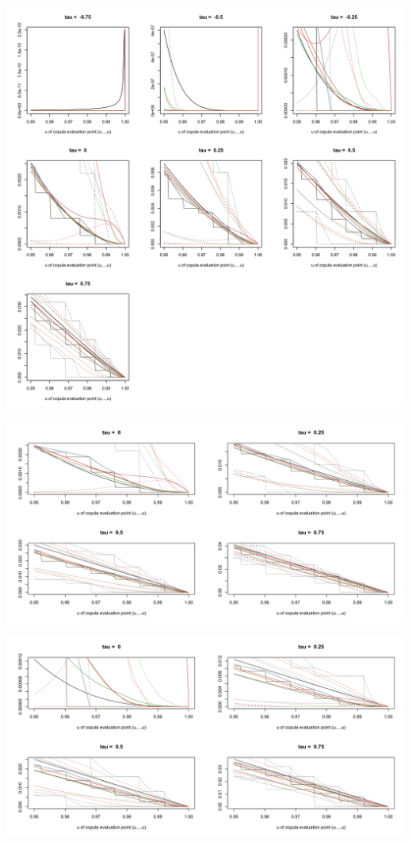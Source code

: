 \documentclass[12pt]{report}
\newcommand{\1}{\mathbf{1}}
\begin{document}
\begin{flushleft}
\begin{center}
\label{N_2d_s}
\includegraphics[width=17cm]{ExceedanceProb/N_2d_s.png}
\end{center}%

\begin{center}
\label{G_2d_s}
\includegraphics[width=17cm]{ExceedanceProb/G_2d_s.png}
\end{center}%

\begin{center}
\label{G_3d_s}
\includegraphics[width=17cm]{ExceedanceProb/G_3d_s.png}
\end{center}%


\end{flushleft}
\end{document}
